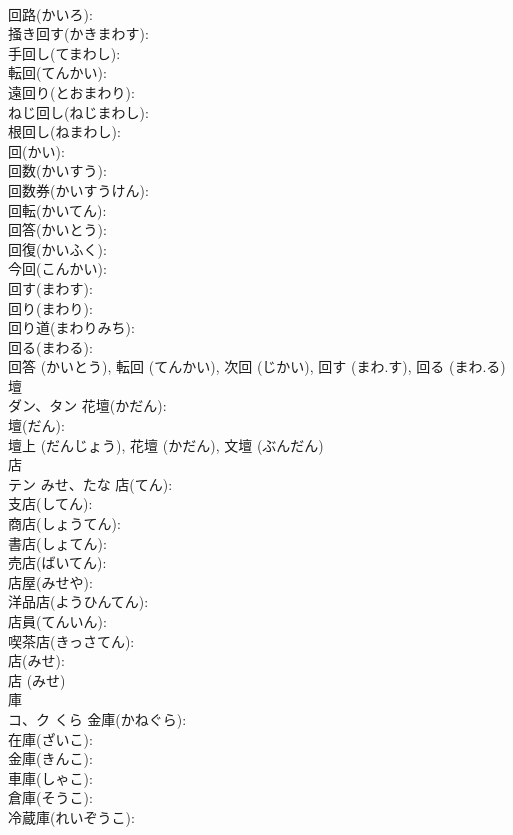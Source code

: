 \documentclass[8pt]{extreport}
\begin{document}
\begin{CJK}{UTF8}{min}
\\	回路(かいろ): 
\\	掻き回す(かきまわす): 
\\	手回し(てまわし): 
\\	転回(てんかい): 
\\	遠回り(とおまわり): 
\\	ねじ回し(ねじまわし): 
\\	根回し(ねまわし): 
\\	回(かい): 
\\	回数(かいすう): 
\\	回数券(かいすうけん): 
\\	回転(かいてん): 
\\	回答(かいとう): 
\\	回復(かいふく): 
\\	今回(こんかい): 
\\	回す(まわす): 
\\	回り(まわり): 
\\	回り道(まわりみち): 
\\	回る(まわる): 
\\	回答 (かいとう), 転回 (てんかい), 次回 (じかい), 回す (まわ.す), 回る (まわ.る)
\\	壇			
\\	ダン、タン		花壇(かだん): 
\\	壇(だん): 
\\	壇上 (だんじょう), 花壇 (かだん), 文壇 (ぶんだん)
\\	店			
\\	テン	みせ、たな	店(てん): 
\\	支店(してん): 
\\	商店(しょうてん): 
\\	書店(しょてん): 
\\	売店(ばいてん): 
\\	店屋(みせや): 
\\	洋品店(ようひんてん): 
\\	店員(てんいん): 
\\	喫茶店(きっさてん): 
\\	店(みせ): 
\\	店 (みせ)
\\	庫			
\\	コ、ク	くら	金庫(かねぐら): 
\\	在庫(ざいこ): 
\\	金庫(きんこ): 
\\	車庫(しゃこ): 
\\	倉庫(そうこ): 
\\	冷蔵庫(れいぞうこ): 

\end{CJK}
\end{document}

